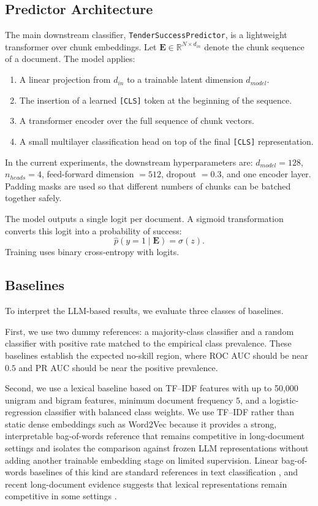 \documentclass[conference]{IEEEtran}
\begin{document}
\subsection{Predictor Architecture}
The main downstream classifier, \texttt{TenderSuccessPredictor}, is a lightweight transformer over chunk embeddings. Let $\mathbf{E} \in \mathbb{R}^{N \times d_{in}}$ denote the chunk sequence of a document. The model applies:

\begin{enumerate}
  \item A linear projection from $d_{in}$ to a trainable latent dimension $d_{model}$.
  \item The insertion of a learned \texttt{[CLS]} token at the beginning of the sequence.
  \item A transformer encoder over the full sequence of chunk vectors.
  \item A small multilayer classification head on top of the final \texttt{[CLS]} representation.
\end{enumerate}

In the current experiments, the downstream hyperparameters are: $d_{model}=128$, $n_{heads}=4$, feed-forward dimension $=512$, dropout $=0.3$, and one encoder layer. Padding masks are used so that different numbers of chunks can be batched together safely.

The model outputs a single logit per document. A sigmoid transformation converts this logit into a probability of success:
\[
\hat{p}(y=1 \mid \mathbf{E}) = \sigma(z).
\]
Training uses binary cross-entropy with logits.

\subsection{Baselines}
To interpret the LLM-based results, we evaluate three classes of baselines.

First, we use two dummy references: a majority-class classifier and a random classifier with positive rate matched to the empirical class prevalence. These baselines establish the expected no-skill region, where ROC AUC should be near $0.5$ and PR AUC should be near the positive prevalence.

Second, we use a lexical baseline based on TF--IDF features with up to 50{,}000 unigram and bigram features, minimum document frequency $5$, and a logistic-regression classifier with balanced class weights. We use TF--IDF rather than static dense embeddings such as Word2Vec because it provides a strong, interpretable bag-of-words reference that remains competitive in long-document settings \cite{wang2012baselines,alvaprincipe2025survey} and isolates the comparison against frozen LLM representations without adding another trainable embedding stage on limited supervision. Linear bag-of-words baselines of this kind are standard references in text classification \cite{wang2012baselines}, and recent long-document evidence suggests that lexical representations remain competitive in some settings \cite{alvaprincipe2025survey}.
\end{document}
